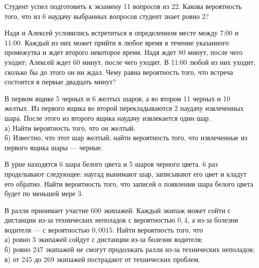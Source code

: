\newpage\setcounter{zad}{0}



\begin{zkrW}{20}\noindent 
	Студент успел подготовить к экзамену 11 вопросов из 22. Какова вероятность того, что из 6 наудачу выбранных вопросов студент знает ровно 2?
 
\end{zkrW}

\begin{zkrW}{20}\noindent 
	Надя и Алексей условились встретиться в определенном месте между 7:00 и 11:00. Каждый из них может прийти в любое время в течение указанного промежутка и ждет второго некоторое время. Надя ждет 80 минут, после чего уходит; Алексей ждет 60 минут, после чего уходит. В 11:00 любой из них уходит, сколько бы до этого он ни ждал. Чему равна вероятность того, что встреча состоится в первые двадцать минут?
 
\end{zkrW}

\begin{zkrW}{20}\noindent 
	В первом ящике 5 черных и 6 желтых шаров, а во втором 11 черных и 10 желтых. Из первого ящика во второй перекладываются 2 наудачу извлеченных шара. После этого из второго ящика наудачу извлекается один шар. \\ \indent а) Найти вероятность того, что он желтый. \\ \indent б) Известно, что этот шар желтый; найти вероятность того, что извлеченные из первого ящика шары --- черные.
 
\end{zkrW}

\begin{zkrW}{20}\noindent 
	В урне находятся 6 шара белого цвета и 5 шаров черного цвета. 6 раз проделывают следующее: наугад вынимают шар, записывают его цвет и кладут его обратно. Найти вероятность того, что записей о появлении шара белого цвета будет по меньшей мере 3.
 
\end{zkrW}

\begin{zkrW}{20}\noindent 
	В ралли принимает участие 600 экипажей. Каждый экипаж может сойти с дистанции из-за технических неполадок с вероятностью $0{,}4$, а из-за болезни водителя --- с вероятностью $0{,}0015$. Найти вероятность того, что \\ \indent а) ровно 3 экипажей сойдут с дистанции из-за болезни водителя; \\ \indent б) ровно 247 экипажей не смогут продолжать ралли из-за технических неполадок; \\ \indent в) от 245 до 269 экипажей пострадают от технических проблем.
 
\end{zkrW}

